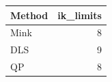 \begin{tabular}{lr}
\toprule
Method & ik\_limits\\
\midrule
Mink & 8\\
DLS & 9\\
QP & 8\\
\bottomrule
\end{tabular}

